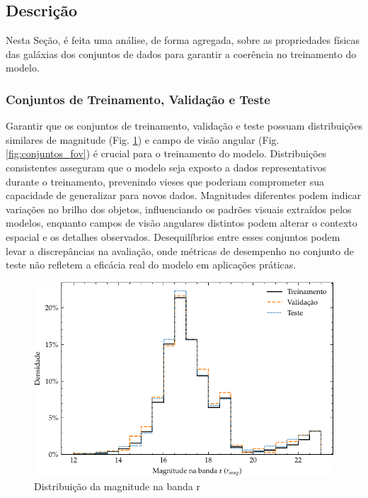 \subsection{Descrição}
\label{sec:aquisicao-descricao}

Nesta Seção, é feita uma análise, de forma agregada, sobre as propriedades físicas das galáxias dos conjuntos de dados para garantir a coerência no treinamento do modelo.

\subsubsection{Conjuntos de Treinamento, Validação e Teste}
\label{sec:aquisicao-treinamento}

Garantir que os conjuntos de treinamento, validação e teste possuam distribuições similares de magnitude (Fig. \ref{fig:conjuntos_magr}) e campo de visão angular (Fig. \ref{fig:conjuntos_fov}) é crucial para o treinamento do modelo. Distribuições consistentes asseguram que o modelo seja exposto a dados representativos durante o treinamento, prevenindo vieses que poderiam comprometer sua capacidade de generalizar para novos dados. Magnitudes diferentes podem indicar variações no brilho dos objetos, influenciando os padrões visuais extraídos pelos modelos, enquanto campos de visão angulares distintos podem alterar o contexto espacial e os detalhes observados. Desequilíbrios entre esses conjuntos podem levar a discrepâncias na avaliação, onde métricas de desempenho no conjunto de teste não refletem a eficácia real do modelo em aplicações práticas.

\begin{figure}[!ht]
  \centering
  \caption{Distribuição da magnitude na banda r}
  \label{fig:conjuntos_magr}
  \includegraphics[width=\linewidth]{notebooks/plots/conjuntos_magr.pdf}
\end{figure}


